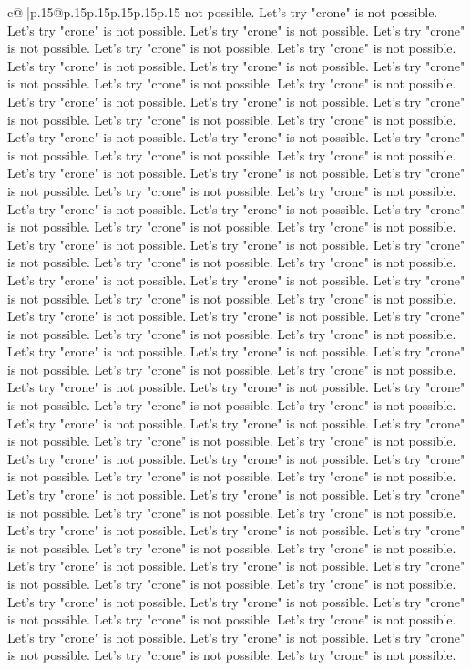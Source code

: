 \documentclass{article}
\begin{document}
{\begin{supertabular}{c@{$\;$}|p{.15\linewidth}@{}p{.15\linewidth}p{.15\linewidth}p{.15\linewidth}p{.15\linewidth}p{.15\linewidth}}
{{{not possible. Let's try "crone" is not possible. Let's try "crone" is not possible. Let's try "crone" is not possible. Let's try "crone" is not possible. Let's try "crone" is not possible. Let's try "crone" is not possible. Let's try "crone" is not possible. Let's try "crone" is not possible. Let's try "crone" is not possible. Let's try "crone" is not possible. Let's try "crone" is not possible. Let's try "crone" is not possible. Let's try "crone" is not possible. Let's try "crone" is not possible. Let's try "crone" is not possible. Let's try "crone" is not possible. Let's try "crone" is not possible. Let's try "crone" is not possible. Let's try "crone" is not possible. Let's try "crone" is not possible. Let's try "crone" is not possible. Let's try "crone" is not possible. Let's try "crone" is not possible. Let's try "crone" is not possible. Let's try "crone" is not possible. Let's try "crone" is not possible. Let's try "crone" is not possible. Let's try "crone" is not possible. Let's try "crone" is not possible. Let's try "crone" is not possible. Let's try "crone" is not possible. Let's try "crone" is not possible. Let's try "crone" is not possible. Let's try "crone" is not possible. Let's try "crone" is not possible. Let's try "crone" is not possible. Let's try "crone" is not possible. Let's try "crone" is not possible. Let's try "crone" is not possible. Let's try "crone" is not possible. Let's try "crone" is not possible. Let's try "crone" is not possible. Let's try "crone" is not possible. Let's try "crone" is not possible. Let's try "crone" is not possible. Let's try "crone" is not possible. Let's try "crone" is not possible. Let's try "crone" is not possible. Let's try "crone" is not possible. Let's try "crone" is not possible. Let's try "crone" is not possible. Let's try "crone" is not possible. Let's try "crone" is not possible. Let's try "crone" is not possible. Let's try "crone" is not possible. Let's try "crone" is not possible. Let's try "crone" is not possible. Let's try "crone" is not possible. Let's try "crone" is not possible. Let's try "crone" is not possible. Let's try "crone" is not possible. Let's try "crone" is not possible. Let's try "crone" is not possible. Let's try "crone" is not possible. Let's try "crone" is not possible. Let's try "crone" is not possible. Let's try "crone" is not possible. Let's try "crone" is not possible. Let's try "crone" is not possible. Let's try "crone" is not possible. Let's try "crone" is not possible. Let's try "crone" is not possible. Let's try "crone" is not possible. Let's try "crone" is not possible. Let's try "crone" is not possible. Let's try "crone" is not possible. Let's try "crone" is not possible. Let's try "crone" is not possible. Let's try "crone" is not possible. Let's try "crone" is not possible. Let's try "crone" is not possible. Let's try "crone" is not possible. Let's try "crone" is not possible. Let's try "crone" is not possible. Let's try "crone" is not possible. Let's try "crone" is not possible. Let's try "crone" is not possible. Let's try "crone" is not possible. Let's try "crone" is not possible. Let's try "crone" is not possible. Let's try "crone" is not possible. }}}
\end{supertabular}}
\end{document}
